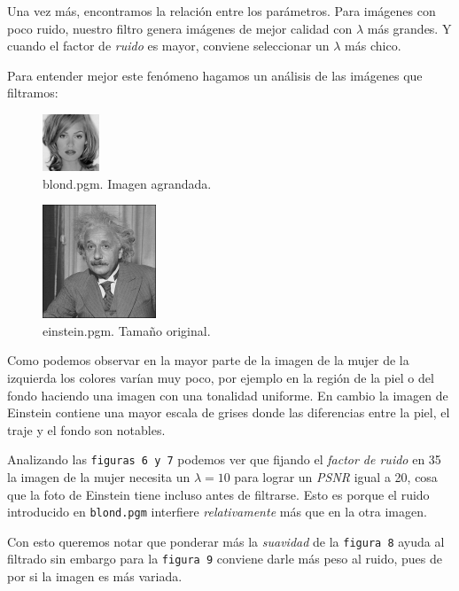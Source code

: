\documentclass[a4paper]{article}
\begin{document}
Una vez más, encontramos la relación entre los parámetros. Para imágenes con poco ruido, nuestro filtro genera imágenes de mejor calidad con $\lambda$ más grandes. Y cuando el factor de \textit{ruido} es mayor, conviene seleccionar un $\lambda$ más chico.

Para entender mejor este fenómeno hagamos un análisis de las imágenes que filtramos:

\begin{multicols}{2}
\begin{figure}[H]
  \centering
  \includegraphics[scale=1.31]{graficos/blond.png}
  \caption{blond.pgm. Imagen agrandada.}
\end{figure}

\begin{figure}[H]
  \centering
  \includegraphics[scale=0.65]{graficos/einstein.png}
  \caption{einstein.pgm. Tamaño original.}
\end{figure}
\end{multicols}

Como podemos observar en la mayor parte de la imagen de la mujer de la izquierda los colores varían muy poco, por ejemplo en la región de la piel o del fondo haciendo una imagen con una tonalidad uniforme. En cambio la imagen de Einstein contiene una mayor escala de grises donde las diferencias entre la piel, el traje y el fondo son notables.

Analizando las \texttt{figuras 6 y 7} podemos ver que fijando el \textit{factor de ruido} en 35 la imagen de la mujer necesita un $\lambda = 10$ para lograr un \textit{PSNR} igual a 20, cosa que la foto de Einstein tiene incluso antes de filtrarse. Esto es porque el ruido introducido en \texttt{blond.pgm} interfiere \textit{relativamente} más que en la otra imagen.

Con esto queremos notar que ponderar más la \textit{suavidad} de la \texttt{figura 8} ayuda al filtrado sin embargo para la \texttt{figura 9} conviene darle más peso al ruido, pues de por si la imagen es más variada.\\
\end{document}
